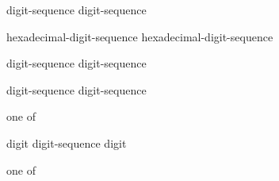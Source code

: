 \begin{bnf}
\br
      digit-sequence\br
    digit-sequence 
\end{bnf}

\begin{bnf}
\br
      hexadecimal-digit-sequence\br
    hexadecimal-digit-sequence 
\end{bnf}

\begin{bnf}
\br
      digit-sequence\br
      digit-sequence
\end{bnf}

\begin{bnf}
\br
      digit-sequence\br
      digit-sequence
\end{bnf}

\begin{bnf}
 \textnormal{one of}\br
    \terminal{+  -}
\end{bnf}

\begin{bnf}
\br
    digit\br
    digit-sequence  digit
\end{bnf}

\begin{bnf}
 \textnormal{one of}\br
\end{bnf}

